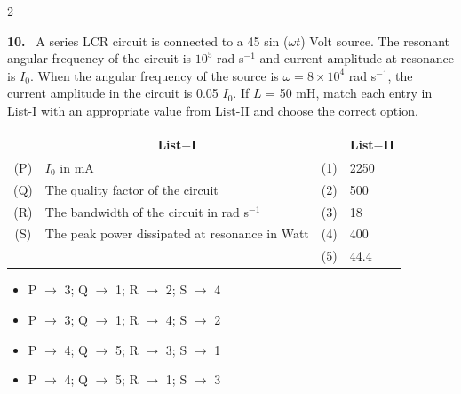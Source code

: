 \documentclass[10pt]{extarticle}
\newcommand{\qn}[1]{\par\smallskip\noindent\textbf{#1.}~}
\newenvironment{qoptions}{\begin{itemize}[leftmargin=1.8em,itemsep=1pt,topsep=2pt,label={}]}{\end{itemize}}
\newcommand{\opt}[2]{\item[(#1)] #2}
\begin{document}
\begin{multicols}{2}
\qn{10} A series LCR circuit is connected to a 45 sin ($\omega t$) Volt source. The resonant angular frequency of the circuit is $10^5$ rad s$^{-1}$ and current amplitude at resonance is $I_0$. When the angular frequency of the source is $\omega=8\times10^4$ rad s$^{-1}$, the current amplitude in the circuit is 0.05 $I_0$. If $L$ = 50 mH, match each entry in List-I with an appropriate value from List-II and choose the correct option.\par\nobreak
\begin{center}\small\setlength{\tabcolsep}{3pt}
\begin{tabular}{|c|p{3.9cm}|c|p{0.8cm}|}
\hline
 & \multicolumn{1}{c|}{\textbf{List$-$I}} & & \multicolumn{1}{c|}{\textbf{\footnotesize List$-$II}} \\
\hline
(P) & $I_0$ in mA & (1) & 2250 \\
\hline
(Q) & The quality factor of the circuit & (2) & 500 \\
\hline
(R) & The bandwidth of the circuit in rad s$^{-1}$ & (3) & 18 \\
\hline
(S) & The peak power dissipated at resonance in Watt & (4) & 400 \\
\hline
 & & (5) & 44.4 \\
\hline
\end{tabular}
\end{center}
\begin{qoptions}
\opt{A}{P $\to$ 3; Q $\to$ 1; R $\to$ 2; S $\to$ 4}
\opt{B}{P $\to$ 3; Q $\to$ 1; R $\to$ 4; S $\to$ 2}
\opt{C}{P $\to$ 4; Q $\to$ 5; R $\to$ 3; S $\to$ 1}
\opt{D}{P $\to$ 4; Q $\to$ 5; R $\to$ 1; S $\to$ 3}
\end{qoptions}


\end{multicols}
\end{document}
